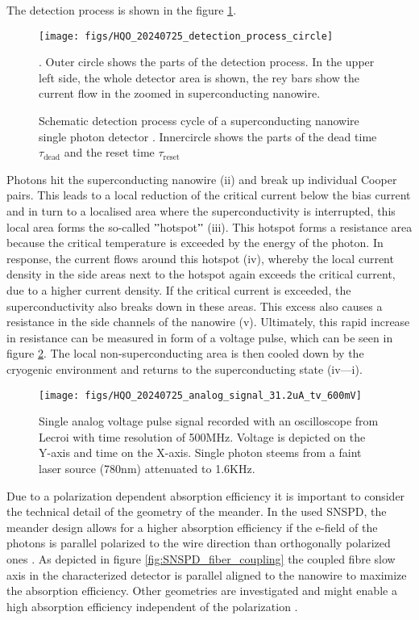 The detection process is shown in the figure \ref{fig: SNSPD_process}.

\begin{figure}[hhh]
    \centering
    \texttt{[image: figs/HQO\_20240725\_detection\_process\_circle]}
    \caption{Schematic detection process cycle of a superconducting nanowire single photon detector \cite{singlequantum_snsd_nodate}.
    Innercircle shows the parts of the dead time $\tau_{\text{dead}}$ and the reset time $\tau_{\text{reset}}$}.
    Outer circle shows the parts of the detection process.
    In the upper left side, the whole detector area is shown, the rey bars show the current flow in the zoomed in superconducting nanowire.
    \label{fig: SNSPD_process}
\end{figure}

Photons hit the superconducting nanowire (ii) and break up individual Cooper pairs.
This leads to a local reduction of the critical current below the bias current and in turn to a localised area where
the superconductivity is interrupted, this local area forms the so-called \("\)hotspot\("\) (iii).
This hotspot forms a resistance area because the critical temperature is exceeded by the energy of the photon.
In response, the current flows around this hotspot (iv), whereby the local current density in the side areas next to the
hotspot again exceeds the critical current, due to a higher current density.
If the critical current is exceeded, the superconductivity also breaks down in these areas.
This excess also causes a resistance in the side channels of the nanowire (v).
Ultimately, this rapid increase in resistance can be measured in form of a voltage pulse, which can be seen in figure \ref{fig:SNSPD_single_voltage_pulse}.
The local non-superconducting area is then cooled down by the cryogenic environment and returns to the superconducting state
(iv—i).\\

\begin{figure}[H]
    \centering
    \texttt{[image: figs/HQO\_20240725\_analog\_signal\_31.2uA\_tv\_600mV]}
    \caption{Single analog voltage pulse signal recorded with an oscilloscope from Lecroi with time resolution of 500MHz.
    Voltage is depicted on the Y-axis and time on the X-axis. Single photon steems from a faint laser source (780nm) attenuated to 1.6KHz.}
    \label{fig:SNSPD_single_voltage_pulse}
\end{figure}


Due to a polarization dependent absorption efficiency it is important to consider the technical detail of the geometry of the meander.
In the used SNSPD, the meander design allows for a higher absorption efficiency if the e-field of the photons
is parallel polarized to the wire direction than orthogonally polarized ones \cite{single-quantum-2022}.
As depicted in figure \ref{fig:SNSPD_fiber_coupling} the coupled fibre slow axis in the characterized
detector is parallel aligned to the nanowire to maximize the absorption efficiency.
Other geometries are investigated and might enable a high absorption efficiency independent of the polarization \cite{zheng-2016}.

